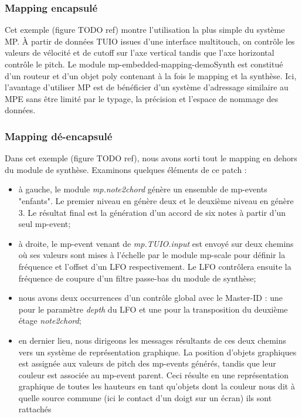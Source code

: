 \subsubsection{Mapping encapsulé}
\noindent Cet exemple (figure TODO ref) montre l'utilisation la plus simple du système MP. À partir de données \gls{TUIO} issues d'une interface multitouch, on contrôle les valeurs de vélocité et de cutoff sur l'axe vertical tandis que l'axe horizontal contrôle le pitch.
Le module mp-embedded-mapping-demoSynth est constitué d'un routeur et d'un objet poly contenant à la fois le mapping et la synthèse. Ici, l'avantage d'utiliser MP est de bénéficier d'un système d'adressage similaire au \gls{MPE} sans être limité par le typage, la précision et l'espace de nommage des données.

\subsubsection{Mapping dé-encapsulé}

\noindent Dans cet exemple (figure TODO ref), nous avons sorti tout le mapping en dehors du module de synthèse. Examinons quelques éléments de ce patch :
\vspace{-1em}
\begin{itemize}[noitemsep]
	\item à gauche, le module \textit{mp.note2chord} génère un ensemble de mp-events "enfants". Le premier niveau en génère deux et le deuxième niveau en génère 3. Le résultat final est la génération d'un accord de six notes à partir d'un seul mp-event;
	\item à droite, le mp-event venant de \textit{mp.TUIO.input} est envoyé sur deux chemins où ses valeurs sont mises à l'échelle par le module mp-scale pour définir la fréquence et l'offset d'un LFO respectivement. Le \gls{LFO} contrôlera ensuite la fréquence de coupure d'un filtre passe-bas du module de synthèse;
	\item nous avons deux occurrences d'un contrôle global avec le Master-ID : une pour le paramètre \textit{depth} du LFO et une pour la transposition du deuxième étage \textit{note2chord};
	\item en dernier lieu, nous dirigeons les messages résultants de ces deux chemins vers un système de représentation graphique. La position d'objets graphiques est assignée aux valeurs de pitch des mp-events générés, tandis que leur couleur est associée au mp-event parent. Ceci résulte en une représentation graphique de toutes les hauteurs en tant qu'objets dont la couleur nous dit à quelle source commune (ici le contact d'un doigt sur un écran) ils sont rattachés
\end{itemize}

